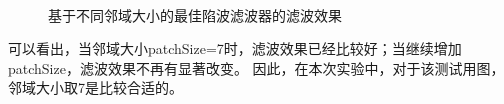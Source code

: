 \documentclass{article}
\begin{document}
\begin{figure}[H]
    \, 
	\caption{基于不同邻域大小的最佳陷波滤波器的滤波效果} 
\end{figure}

可以看出，当邻域大小patchSize=7时，滤波效果已经比较好；当继续增加patchSize，滤波效果不再有显著改变。
因此，在本次实验中，对于该测试用图，邻域大小取7是比较合适的。
\end{document}
